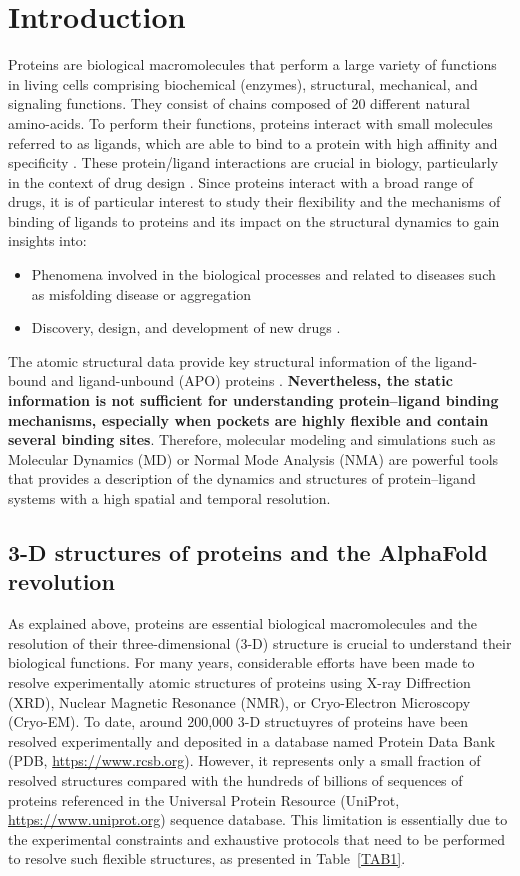 \chapter{Introduction}
Proteins are biological macromolecules that perform a large variety of functions in living cells comprising biochemical (enzymes), structural, mechanical, and signaling functions. They consist of chains composed of 20 different natural amino-acids. To perform their functions, proteins interact with small molecules referred to as ligands, which are able to bind to a protein with high affinity and specificity \cite{du2016insights}. These protein/ligand interactions are crucial in biology, particularly in the context of drug design \cite{li2019predicting}. Since proteins interact with a broad range of drugs, it is of particular interest to study their flexibility and the mechanisms of binding of ligands to proteins and its impact on the structural dynamics to gain insights into:
\begin{itemize}
	\item Phenomena involved in the biological processes and related to diseases \cite{silva2010ligand} such as misfolding disease or aggregation
	\item Discovery, design, and development of new drugs \cite{payandeh2021ligand}.
\end{itemize}
 The atomic structural data provide key structural information of the ligand-bound and ligand-unbound (APO) proteins \cite{chakraborti2021all}. \textbf{Nevertheless, the static information is not sufficient for understanding protein–ligand binding mechanisms, especially when pockets are highly flexible and contain several binding sites}. Therefore, molecular modeling and simulations such as Molecular Dynamics (MD) or Normal Mode Analysis (NMA) are powerful tools that provides a description of the dynamics and structures of protein–ligand systems with a high spatial and temporal resolution.
 
 \section{3-D structures of proteins and the AlphaFold revolution}
 
 As explained above, proteins are essential biological macromolecules and the resolution of their three-dimensional (3-D) structure is crucial to understand their biological functions. For many years, considerable efforts have been made to resolve experimentally atomic structures of proteins using X-ray Diffrection (XRD), Nuclear Magnetic Resonance (NMR), or Cryo-Electron Microscopy (Cryo-EM). To date, around 200,000 3-D structuyres of proteins have been resolved experimentally and deposited in a database named Protein Data Bank (PDB, \url{https://www.rcsb.org}). However, it represents only a small fraction of resolved structures compared with the hundreds of billions of sequences of proteins referenced in the Universal Protein Resource (UniProt, \url{https://www.uniprot.org}) sequence database. This limitation is essentially due to the experimental constraints and exhaustive protocols that need to be performed to resolve such flexible structures, as presented in Table~\ref{TAB1}.
 
